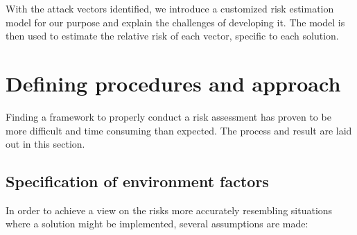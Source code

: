 With the attack vectors identified, we introduce a customized risk estimation model for our purpose and explain the challenges of developing it. The model is then used to estimate the relative risk of each vector, specific to each solution.

\section{Defining procedures and approach}
Finding a framework to properly conduct a risk assessment has proven to be more difficult and time consuming than expected. The process and result are laid out in this section.

\subsection{Specification of environment factors}
In order to achieve a view on the risks more accurately resembling situations where a solution might be implemented, several assumptions are made:

